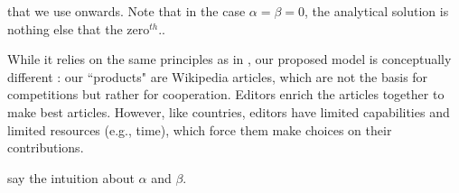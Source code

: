 that we use onwards. Note that in the case $\alpha = \beta = 0$, the analytical solution is nothing else that the zero$^{th}$..

While it relies on the same principles as in \cite{caldarelli2012network}, our proposed model is conceptually different : our ``products" are Wikipedia articles, which are not the basis for competitions but rather for cooperation. Editors enrich the articles together to make best articles. However, like countries, editors have limited capabilities and limited resources (e.g., time), which force them make choices on their contributions.


say the intuition about $\alpha$ and $\beta$.


